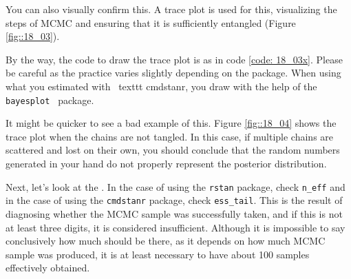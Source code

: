 \documentclass{ltjsbook}
\begin{document}
You can also visually confirm this. A trace plot is used for this, visualizing the steps of MCMC and ensuring that it is sufficiently entangled (Figure \ref{fig::18_03}).

By the way, the code to draw the trace plot is as in code \ref{code: 18_03x}. Please be careful as the practice varies slightly depending on the package. When using what you estimated with \ texttt {cmdstanr}, you draw with the help of the \verb| bayesplot | package.





It might be quicker to see a bad example of this. Figure \ref{fig::18_04} shows the trace plot when the chains are not tangled. In this case, if multiple chains are scattered and lost on their own, you should conclude that the random numbers generated in your hand do not properly represent the posterior distribution.


Next, let's look at the . In the case of using the \texttt{rstan} package, check \verb|n_eff| and in the case of using the \texttt{cmdstanr} package, check \verb|ess_tail|. This is the result of diagnosing whether the MCMC sample was successfully taken, and if this is not at least three digits, it is considered insufficient. Although it is impossible to say conclusively how much should be there, as it depends on how much MCMC sample was produced, it is at least necessary to have about 100 samples effectively obtained.
\end{document}
